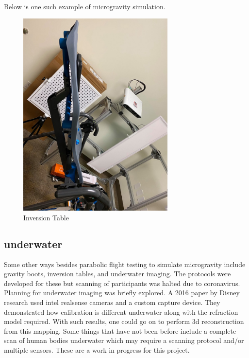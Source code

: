 Below is one such example of microgravity simulation.
\begin{figure}[h]
	\caption{Inversion Table}
	\centering
	\includegraphics[width=0.7\textwidth]{images/inversion.jpg}
\end{figure}
\subsection{underwater}
Some other ways besides parabolic flight testing to simulate microgravity include gravity boots, inversion tables, and underwater imaging. The protocols were developed for these but scanning of participants was halted due to coronavirus. Planning for underwater imaging was briefly explored. A 2016 paper by Disney research \cite{digumarti2016underwater} used intel realsense cameras and a custom capture device. They demonstrated how calibration is different underwater along with the refraction model required. With such results, one could go on to perform 3d reconstruction from this mapping. Some things that have not been before include a complete scan of human bodies underwater which may require a scanning protocol and/or multiple sensors. These are a work in progress for this project.
